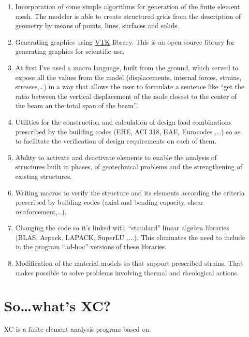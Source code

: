 \begin{enumerate}
\item Incorporation of some simple algorithms for generation of the finite element mesh. The modeler is able to create structured grids from the description of geometry by means of points, lines, surfaces and solids.

\item Generating graphics using \href{http://www.vtk.org}{VTK} library. This is an open source library for generating graphics for scientific use. 

\item At first I've used a macro language, built from the ground, which served to expose all the values from the model (displacements, internal forces, strains, stresses,\ldots) in a way that allows the user to formulate a sentence like ``get the ratio between the vertical displacement of the node closest to the center of the beam an the total span of the beam''.

\item Utilities for the construction and calculation of design load
combinations prescribed by the building codes (EHE, ACI 318, EAE,
Eurocodes ,\ldots) so as to facilitate the verification of design 
requirements on each of them.

\item Ability to activate and deactivate elements to enable the analysis
of structures built in phases, of geotechnical problems and the
strengthening of existing structures.

\item Writing macros to verify the structure and its elements according
the criteria prescribed by building codes (axial and bending capacity,
shear reinforcement,\ldots).

\item Changing the code so it's linked with ``standard'' linear algebra
libraries (BLAS, Arpack, LAPACK, SuperLU ,...). This eliminates the need
to include in the program ``ad-hoc'' versions of these libraries.

\item Modification of the material models so that support prescribed
strains. That makes possible to solve problems involving thermal and
rheological actions.
\end{enumerate}

\section{So\ldots what's XC?}
XC is a finite element analysis program based on:

